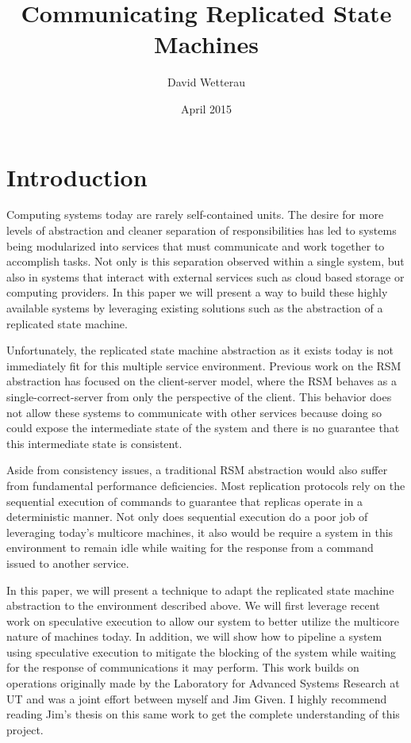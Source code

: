 \documentclass[11pt, oneside]{report}
\title{Communicating Replicated State Machines}
\author{David Wetterau}
\date{April 2015}
\begin{document}
\maketitle

\tableofcontents

\chapter{Introduction}
Computing systems today are rarely self-contained units. The desire for more levels of abstraction and cleaner separation of responsibilities has led to systems being modularized into services that must communicate and work together to accomplish tasks. Not only is this separation observed within a single system, but also in systems that interact with external services such as cloud based storage or computing providers. In this paper we will present a way to build these highly available systems by leveraging existing solutions such as the abstraction of a replicated state machine.

Unfortunately, the replicated state machine abstraction as it exists today is not immediately fit for this multiple service environment. Previous work on the RSM abstraction has focused on the client-server model, where the RSM behaves as a single-correct-server from only the perspective of the client. This behavior does not allow these systems to communicate with other services because doing so could expose the intermediate state of the system and there is no guarantee that this intermediate state is consistent.

Aside from consistency issues, a traditional RSM abstraction would also suffer from fundamental performance deficiencies. Most replication protocols rely on the sequential execution of commands to guarantee that replicas operate in a deterministic manner. Not only does sequential execution do a poor job of leveraging today’s multicore machines, it also would be require a system in this environment to remain idle while waiting for the response from a command issued to another service.

In this paper, we will present a technique to adapt the replicated state machine abstraction to the environment described above. We will first leverage recent work on speculative execution to allow our system to better utilize the multicore nature of machines today. In addition, we will show how to pipeline a system using speculative execution to mitigate the blocking of the system while waiting for the response of communications it may perform. This work builds on operations originally made by the Laboratory for Advanced Systems Research at UT and was a joint effort between myself and Jim Given. I highly recommend reading Jim’s thesis on this same work to get the complete understanding of this project.
\end{document}
